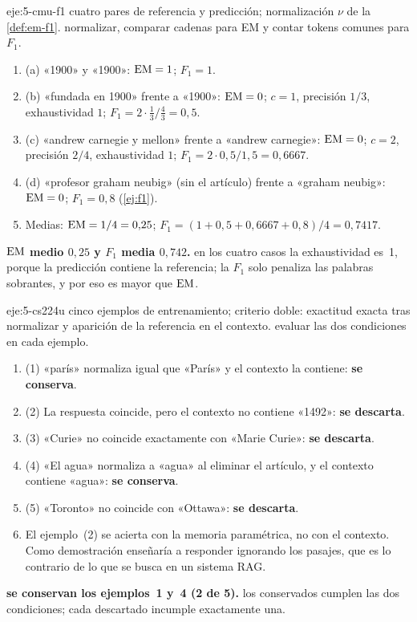 \begin{solucion}{eje:5-cmu-f1}
\datos cuatro pares de referencia y predicción; normalización $\nu$ de la \cref{def:em-f1}.
\planteamiento normalizar, comparar cadenas para EM y contar tokens comunes para $F_1$.
\pasos
\begin{enumerate}[label=\arabic*.]
  \item (a) «1900» y «1900»: $\operatorname{EM}=1$; $F_1=1$.
  \item (b) «fundada en 1900» frente a «1900»: $\operatorname{EM}=0$; $c=1$, precisión $1/3$, exhaustividad $1$; $F_1=2\cdot\frac13/\frac43=0{,}5$.
  \item (c) «andrew carnegie y mellon» frente a «andrew carnegie»: $\operatorname{EM}=0$; $c=2$, precisión $2/4$, exhaustividad $1$; $F_1=2\cdot 0{,}5/1{,}5=0{,}6667$.
  \item (d) «profesor graham neubig» (sin el artículo) frente a «graham neubig»: $\operatorname{EM}=0$; $F_1=0{,}8$ (\cref{ej:f1}).
  \item Medias: $\operatorname{EM}=1/4=0{,}25$; $F_1=(1+0{,}5+0{,}6667+0{,}8)/4=0{,}7417$.
\end{enumerate}
\resultado \textbf{$\operatorname{EM}$ medio $0{,}25$ y $F_1$ media $0{,}742$.}
\comprobacion en los cuatro casos la exhaustividad es~1, porque la predicción contiene la referencia; la $F_1$ solo penaliza las palabras sobrantes, y por eso es mayor que $\operatorname{EM}$.
\end{solucion}

\begin{solucion}{eje:5-cs224u}
\datos cinco ejemplos de entrenamiento; criterio doble: exactitud exacta tras normalizar y aparición de la referencia en el contexto.
\planteamiento evaluar las dos condiciones en cada ejemplo.
\pasos
\begin{enumerate}[label=\arabic*.]
  \item (1) «parís» normaliza igual que «París» y el contexto la contiene: \textbf{se conserva}.
  \item (2) La respuesta coincide, pero el contexto no contiene «1492»: \textbf{se descarta}.
  \item (3) «Curie» no coincide exactamente con «Marie Curie»: \textbf{se descarta}.
  \item (4) «El agua» normaliza a «agua» al eliminar el artículo, y el contexto contiene «agua»: \textbf{se conserva}.
  \item (5) «Toronto» no coincide con «Ottawa»: \textbf{se descarta}.
  \item El ejemplo~(2) se acierta con la memoria paramétrica, no con el contexto. Como demostración enseñaría a responder ignorando los pasajes, que es lo contrario de lo que se busca en un sistema RAG.
\end{enumerate}
\resultado \textbf{se conservan los ejemplos~1 y~4 (2 de 5).}
\comprobacion los conservados cumplen las dos condiciones; cada descartado incumple exactamente una.
\end{solucion}

